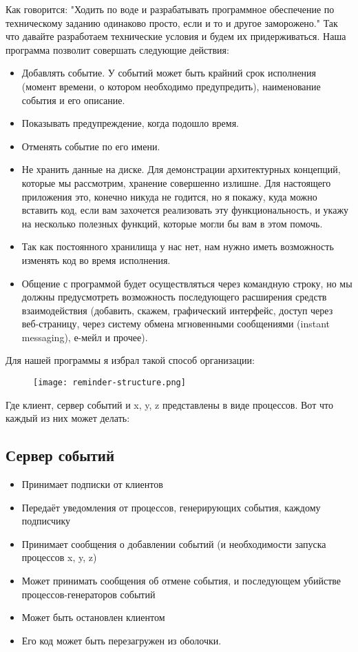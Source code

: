 Как говорится: "Ходить по воде и разрабатывать программное обеспечение по техническому заданию одинаково просто, если и то и другое заморожено."
Так что давайте разработаем технические условия и будем их придерживаться.
Наша программа позволит совершать следующие действия:
\begin{itemize}
\item Добавлять событие.
У событий может быть крайний срок исполнения (момент времени, о котором необходимо предупредить), наименование события и его описание.
\item Показывать предупреждение, когда подошло время.
\item Отменять событие по его имени.
\item Не хранить данные на диске.
    Для демонстрации архитектурных концепций, которые мы рассмотрим, хранение совершенно излишне.
Для настоящего приложения это, конечно никуда не годится, но я покажу, куда можно вставить код, если вам захочется реализовать эту функциональность, и укажу на несколько полезных функций, которые могли бы вам в этом помочь.
\item Так как постоянного хранилища у нас нет, нам нужно иметь возможность изменять код во время исполнения.
\item Общение с программой будет осуществляться через командную строку, но мы должны предусмотреть возможность последующего расширения  средств взаимодействия (добавить, скажем, графический интерфейс, доступ через веб\--страницу, через систему обмена мгновенными сообщениями (instant messaging), е\--мейл и прочее).
\end{itemize}

Для нашей программы я избрал такой способ организации:
\begin{figure}[h!]
    \centering
    \texttt{[image: reminder-structure.png]}
\end{figure}

Где клиент, сервер событий и x, y, z представлены в виде процессов.
Вот что каждый из них может делать:
\subsection{Сервер событий}
\begin{itemize}
\item Принимает подписки от клиентов
\item Передаёт уведомления от процессов, генерирующих события, каждому подписчику
\item Принимает сообщения о добавлении событий (и необходимости запуска процессов x, y, z)
\item Может принимать сообщения об отмене события, и последующем убийстве процессов\--генераторов событий
\item Может быть остановлен клиентом
\item Его код может быть перезагружен из оболочки.
\end{itemize}
